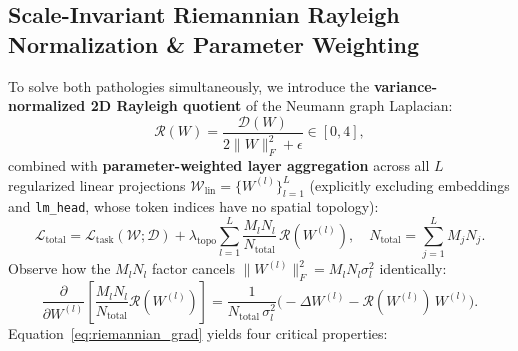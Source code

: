 \documentclass[11pt,a4paper]{article}
\begin{document}
\subsection{Scale-Invariant Riemannian Rayleigh Normalization \& Parameter Weighting}
To solve both pathologies simultaneously, we introduce the \textbf{variance-normalized 2D Rayleigh quotient} of the Neumann graph Laplacian:
\begin{equation}
    \mathcal{R}(W) = \frac{\mathcal{D}(W)}{2\|W\|_F^2 + \epsilon} \in [0, 4],
    \label{eq:rayleigh}
\end{equation}
combined with \textbf{parameter-weighted layer aggregation} across all $L$ regularized linear projections $\mathcal{W}_{\text{lin}} = \{W^{(l)}\}_{l=1}^L$ (explicitly excluding embeddings and \texttt{lm\_head}, whose token indices have no spatial topology):
\begin{equation}
    \mathcal{L}_{\text{total}} = \mathcal{L}_{\text{task}}(\mathcal{W}; \mathcal{D}) + \lambda_{\text{topo}} \sum_{l=1}^L \frac{M_l N_l}{N_{\text{total}}} \, \mathcal{R}(W^{(l)}), \quad N_{\text{total}} = \sum_{j=1}^L M_j N_j.
    \label{eq:total_loss}
\end{equation}
Observe how the $M_l N_l$ factor cancels $\|W^{(l)}\|_F^2 = M_l N_l \sigma_l^2$ identically:
\begin{equation}
    \frac{\partial}{\partial W^{(l)}} \left[ \frac{M_l N_l}{N_{\text{total}}} \mathcal{R}(W^{(l)}) \right]
    = \frac{1}{N_{\text{total}}\,\sigma_l^2} \Big( -\Delta W^{(l)} - \mathcal{R}(W^{(l)})\,W^{(l)} \Big).
    \label{eq:riemannian_grad}
\end{equation}
Equation~\eqref{eq:riemannian_grad} yields four critical properties:
\end{document}
